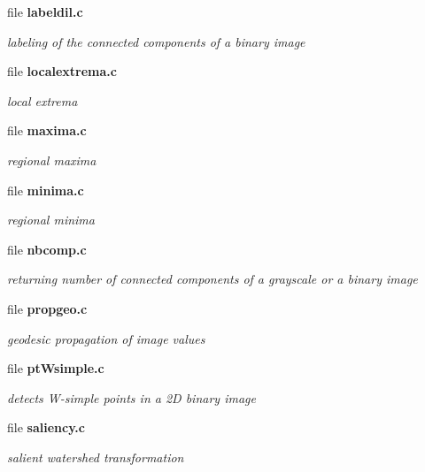\begin{CompactItemize}
\item 
file {\bf labeldil.c}
\begin{CompactList}\small\item\em labeling of the connected components of a binary image \item\end{CompactList}

\item 
file {\bf localextrema.c}
\begin{CompactList}\small\item\em local extrema \item\end{CompactList}

\item 
file {\bf maxima.c}
\begin{CompactList}\small\item\em regional maxima \item\end{CompactList}

\item 
file {\bf minima.c}
\begin{CompactList}\small\item\em regional minima \item\end{CompactList}

\item 
file {\bf nbcomp.c}
\begin{CompactList}\small\item\em returning number of connected components of a grayscale or a binary image \item\end{CompactList}

\item 
file {\bf propgeo.c}
\begin{CompactList}\small\item\em geodesic propagation of image values \item\end{CompactList}

\item 
file {\bf ptWsimple.c}
\begin{CompactList}\small\item\em detects W-simple points in a 2D binary image \item\end{CompactList}

\item 
file {\bf saliency.c}
\begin{CompactList}\small\item\em salient watershed transformation \item\end{CompactList}


\end{CompactItemize}
